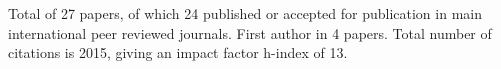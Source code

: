 Total of 27 papers, of which 24 published or accepted for publication in main international peer reviewed journals. First author in 4 papers.
\noindent Total number of citations is 2015, giving an impact factor h-index of 13.

